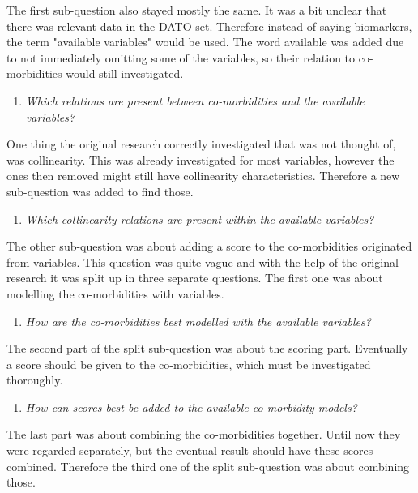 \documentclass[10pt,a4paper]{report}
\begin{document}
	The first sub-question also stayed mostly the same. It was a bit unclear that there was relevant data in the DATO set. Therefore instead of saying biomarkers, the term "available variables" would be used. The word available was added due to not immediately omitting some of the variables, so their relation to co-morbidities would still investigated.
	
	\begin{enumerate}
		\item \emph{Which relations are present between co-morbidities and the available variables?}
	\end{enumerate}
	
	One thing the original research correctly investigated that was not thought of, was collinearity. This was already investigated for most variables, however the ones then removed might still have collinearity characteristics. Therefore a new sub-question was added to find those.
	
	\begin{enumerate}[resume]
		\item \emph{Which collinearity relations are present within the available variables?}
	\end{enumerate}
	
	The other sub-question was about adding a score to the co-morbidities originated from variables. This question was quite vague and with the help of the original research it was split up in three separate questions. The first one was about modelling the co-morbidities with variables.
	
	\begin{enumerate}[resume]
		\item \emph{How are the co-morbidities best modelled with the available variables?}
	\end{enumerate}
	
	The second part of the split sub-question was about the scoring part. Eventually a score should be given to the co-morbidities, which must be investigated thoroughly.
	
	\begin{enumerate}[resume]
		\item \emph{How can scores best be added to the available co-morbidity models?}
	\end{enumerate}
	
	The last part was about combining the co-morbidities together. Until now they were regarded separately, but the eventual result should have these scores combined. Therefore the third one of the split sub-question was about combining those.
	
\end{document}
